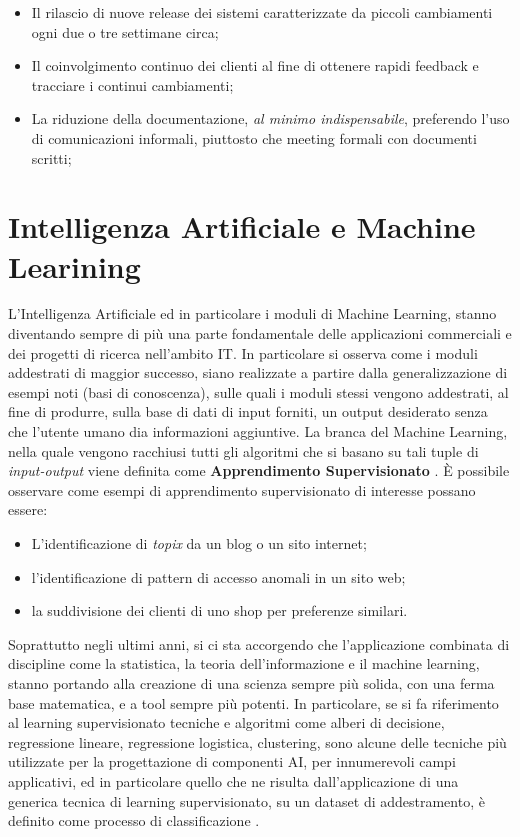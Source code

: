 \begin{itemize}
    \item Il rilascio di nuove release dei sistemi caratterizzate da piccoli cambiamenti ogni due o tre settimane circa; 
    \item Il coinvolgimento continuo dei clienti al fine di ottenere rapidi feedback e tracciare i continui cambiamenti;
    \item La riduzione della  documentazione, \emph{al minimo indispensabile}, preferendo l'uso di comunicazioni informali, piuttosto che meeting formali con documenti scritti;
    
\end{itemize}
\section{Intelligenza Artificiale e Machine Learining}
L'Intelligenza Artificiale ed in particolare i moduli di Machine Learning, stanno diventando sempre di più una parte fondamentale delle applicazioni commerciali e dei progetti di ricerca nell'ambito IT. In particolare si osserva come i moduli addestrati di maggior successo, siano realizzate a partire dalla generalizzazione di esempi noti (basi di conoscenza), sulle quali i moduli stessi vengono addestrati, al fine di produrre, sulla base di dati di input forniti, un output desiderato senza che l'utente umano dia informazioni aggiuntive. La branca del Machine Learning, nella quale vengono racchiusi tutti gli algoritmi che si basano su tali tuple di \textit{input-output} viene definita come \textbf{Apprendimento Supervisionato} \cite{libroMLs}.
È possibile osservare come esempi di apprendimento supervisionato di interesse possano essere:
\begin{itemize}
    \item L'identificazione di \textit{topix} da un blog o un sito internet;
    \item l'identificazione di pattern di accesso anomali in un sito web;
    \item la suddivisione dei clienti di uno shop per preferenze similari.
\end{itemize}

Soprattutto negli ultimi anni, si ci sta accorgendo che l'applicazione combinata di discipline come la statistica, la teoria dell'informazione e il machine learning, stanno portando alla creazione di una scienza sempre più solida, con una ferma base matematica, e a tool sempre più potenti. In particolare, se si fa riferimento al learning supervisionato tecniche e algoritmi come alberi di decisione, regressione lineare, regressione logistica, clustering, sono alcune delle tecniche più utilizzate per la progettazione di componenti AI, per innumerevoli campi applicativi, ed in particolare quello che ne risulta dall'applicazione di una generica tecnica di learning supervisionato, su un dataset di addestramento, è definito come processo di classificazione \cite{supervisedML&Classification}. \\

